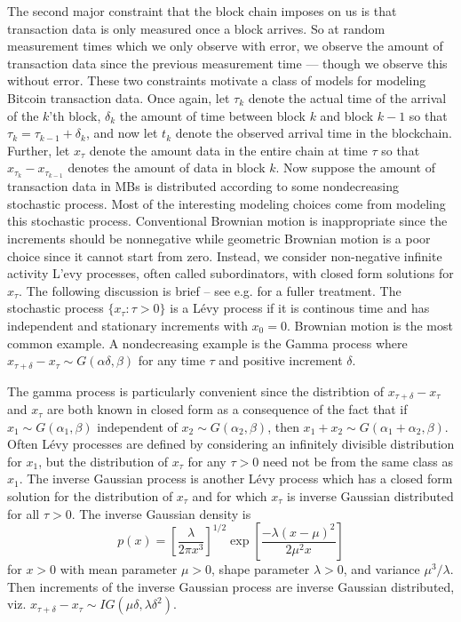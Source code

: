 \documentclass{article}
\begin{document}
The second major constraint that the block chain imposes on us is that transaction data is only measured once a block arrives. So at random measurement times which we only observe with error, we observe the amount of transaction data since the previous measurement time --- though we observe this without error. These two constraints motivate a class of models for modeling Bitcoin transaction data. Once again, let $\tau_k$ denote the actual time of the arrival of the $k$'th block, $\delta_k$ the amount of time between block $k$ and block $k-1$ so that $\tau_{k}=\tau_{k-1} + \delta_k$, and now let $t_k$ denote the observed arrival time in the blockchain. Further, let $x_\tau$ denote the amount data in the entire chain at time $\tau$ so that $x_{\tau_{k}} - x_{\tau_{k-1}}$ denotes the amount of data in block $k$. Now suppose the amount of transaction data in MBs is distributed according to some nondecreasing stochastic process. Most of the interesting modeling choices come from modeling this stochastic process. Conventional Brownian motion is inappropriate since the increments should be nonnegative while geometric Brownian motion is a poor choice since it cannot start from zero. Instead, we consider non-negative infinite activity L'{e}vy processes, often called subordinators, with closed form solutions for $x_{\tau}$. The following discussion is brief -- see e.g. \citet{barndorff2012basics} for a fuller treatment. The stochastic process $\{x_{\tau}:\tau>0\}$ is a L\'{e}vy process if it is continous time and has independent and stationary increments with $x_0=0$. Brownian motion is the most common example. A nondecreasing example is the Gamma process where $x_{\tau + \delta} - x_{\tau} \sim G(\alpha \delta, \beta)$ for any time $\tau$ and positive increment $\delta$. 

The gamma process is particularly convenient since the distribtion of $x_{\tau+\delta} - x_\tau$ and $x_\tau$ are both known in closed form as a consequence of the fact that if $x_1\sim G(\alpha_1,\beta)$ independent of $x_2\sim G(\alpha_2,\beta)$, then $x_1+x_2 \sim G(\alpha_1 + \alpha_2, \beta)$. Often L\'{e}vy processes are defined by considering an infinitely divisible distribution for $x_1$, but the distribution of $x_{\tau}$ for any $\tau>0$ need not be from the same class as $x_1$. The inverse Gaussian process is another L\'{e}vy process which has a closed form solution for the distribution of $x_\tau$ and for which $x_\tau$ is inverse Gaussian distributed for all $\tau>0$. The inverse Gaussian density is
\[
p(x) = \left[\frac{\lambda}{2\pi x^3}\right]^{1/2}\exp\left[\frac{-\lambda(x - \mu)^2}{2\mu^2x}\right]
\]
for $x>0$ with mean parameter $\mu>0$, shape parameter $\lambda>0$, and variance $\mu^3/\lambda$. Then increments of the inverse Gaussian process are inverse Gaussian distributed, viz. $x_{\tau + \delta} - x_\tau \sim IG(\mu\delta,\lambda\delta^2)$.
\end{document}
